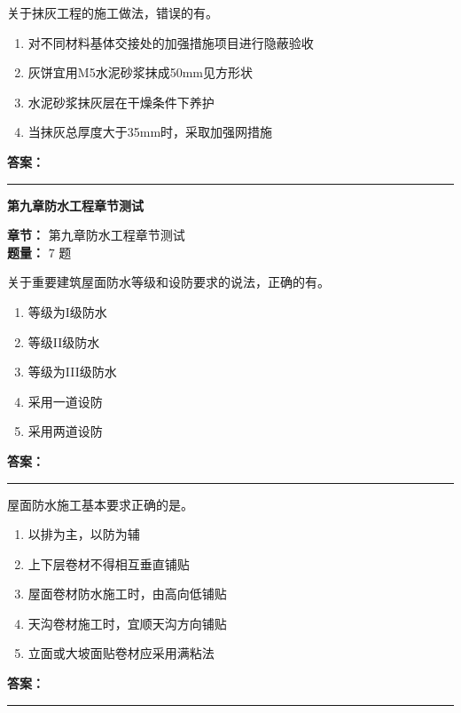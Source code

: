\documentclass[UTF8,fontset=fandol,11pt]{ctexart}
\newcommand{\chaptertitle}[1]{\vspace{0.5em}\begin{tcolorbox}[enhanced,colback=deepblue,colframe=deepblue,arc=2mm,boxrule=0pt]\begin{center}\Large\bfseries\color{white}#1\end{center}\end{tcolorbox}\vspace{0.5em}}
\newcommand{\answerline}{\textcolor{answerred}{\rule{2.4cm}{0.7pt}}}
\begin{document}
\vspace{0.2em}

\begin{quizbox}[title={第 2 题}]
关于抹灰工程的施工做法，错误的有。\\
\begin{enumerate}[label=\Alph*.]
\item 对不同材料基体交接处的加强措施项目进行隐蔽验收
\item 灰饼宜用M5水泥砂浆抹成50mm见方形状
\item 水泥砂浆抹灰层在干燥条件下养护
\item 当抹灰总厚度大于35mm时，采取加强网措施
\end{enumerate}
\textbf{\textcolor{answerred}{答案：}} \answerline
\end{quizbox}

\vspace{0.2em}

\chaptertitle{第九章防水工程章节测试}
\begin{mainbox}
\textbf{\textcolor{mainblue}{章节：}} 第九章防水工程章节测试\\
\textbf{\textcolor{answerred}{题量：}} 7 题
\end{mainbox}

\begin{quizbox}[title={第 1 题}]
关于重要建筑屋面防水等级和设防要求的说法，正确的有。\\
\begin{enumerate}[label=\Alph*.]
\item 等级为I级防水
\item 等级II级防水
\item 等级为III级防水
\item 采用一道设防
\item 采用两道设防
\end{enumerate}
\textbf{\textcolor{answerred}{答案：}} \answerline
\end{quizbox}

\vspace{0.2em}

\begin{quizbox}[title={第 2 题}]
屋面防水施工基本要求正确的是。\\
\begin{enumerate}[label=\Alph*.]
\item 以排为主，以防为辅
\item 上下层卷材不得相互垂直铺贴
\item 屋面卷材防水施工时，由高向低铺贴
\item 天沟卷材施工时，宜顺天沟方向铺贴
\item 立面或大坡面贴卷材应采用满粘法
\end{enumerate}
\textbf{\textcolor{answerred}{答案：}} \answerline
\end{quizbox}
\end{document}
